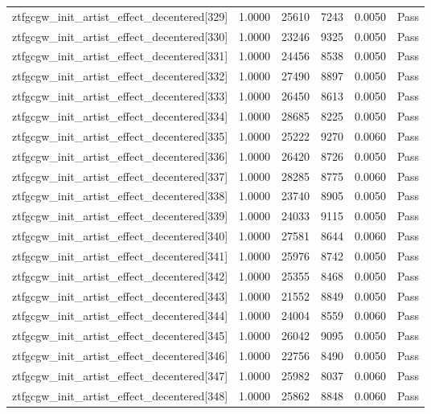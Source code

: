 \begin{table}[htbp]
\begin{tabular}{llrrll}
ztfgcgw\_init\_artist\_effect\_decentered[329] & 1.0000 & 25610 & 7243 & 0.0050 & Pass \\
ztfgcgw\_init\_artist\_effect\_decentered[330] & 1.0000 & 23246 & 9325 & 0.0050 & Pass \\
ztfgcgw\_init\_artist\_effect\_decentered[331] & 1.0000 & 24456 & 8538 & 0.0050 & Pass \\
ztfgcgw\_init\_artist\_effect\_decentered[332] & 1.0000 & 27490 & 8897 & 0.0050 & Pass \\
ztfgcgw\_init\_artist\_effect\_decentered[333] & 1.0000 & 26450 & 8613 & 0.0050 & Pass \\
ztfgcgw\_init\_artist\_effect\_decentered[334] & 1.0000 & 28685 & 8225 & 0.0050 & Pass \\
ztfgcgw\_init\_artist\_effect\_decentered[335] & 1.0000 & 25222 & 9270 & 0.0060 & Pass \\
ztfgcgw\_init\_artist\_effect\_decentered[336] & 1.0000 & 26420 & 8726 & 0.0050 & Pass \\
ztfgcgw\_init\_artist\_effect\_decentered[337] & 1.0000 & 28285 & 8775 & 0.0060 & Pass \\
ztfgcgw\_init\_artist\_effect\_decentered[338] & 1.0000 & 23740 & 8905 & 0.0050 & Pass \\
ztfgcgw\_init\_artist\_effect\_decentered[339] & 1.0000 & 24033 & 9115 & 0.0050 & Pass \\
ztfgcgw\_init\_artist\_effect\_decentered[340] & 1.0000 & 27581 & 8644 & 0.0060 & Pass \\
ztfgcgw\_init\_artist\_effect\_decentered[341] & 1.0000 & 25976 & 8742 & 0.0050 & Pass \\
ztfgcgw\_init\_artist\_effect\_decentered[342] & 1.0000 & 25355 & 8468 & 0.0050 & Pass \\
ztfgcgw\_init\_artist\_effect\_decentered[343] & 1.0000 & 21552 & 8849 & 0.0050 & Pass \\
ztfgcgw\_init\_artist\_effect\_decentered[344] & 1.0000 & 24004 & 8559 & 0.0060 & Pass \\
ztfgcgw\_init\_artist\_effect\_decentered[345] & 1.0000 & 26042 & 9095 & 0.0050 & Pass \\
ztfgcgw\_init\_artist\_effect\_decentered[346] & 1.0000 & 22756 & 8490 & 0.0050 & Pass \\
ztfgcgw\_init\_artist\_effect\_decentered[347] & 1.0000 & 25982 & 8037 & 0.0060 & Pass \\
ztfgcgw\_init\_artist\_effect\_decentered[348] & 1.0000 & 25862 & 8848 & 0.0060 & Pass \\

\end{tabular}
\end{table}
